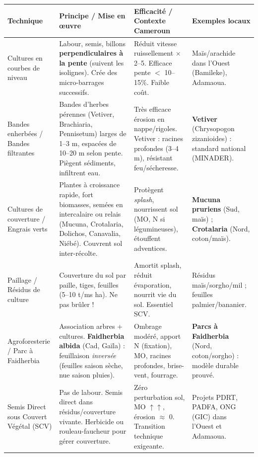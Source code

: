\documentclass[11pt]{article}
\newcommand{\cle}[1]{{\popxbold\color{popdark}#1}}
\begin{document}
\begin{center}
\begin{tabularx}{\linewidth}{|l|X|X|l|}
\hline
\rowcolor{popblueL}
\textbf{Technique} & \textbf{Principe / Mise en œuvre} & \textbf{Efficacité / Contexte Cameroun} & \textbf{Exemples locaux} \\ \hline
\cle{Cultures en courbes de niveau} & Labour, semis, billons \textbf{perpendiculaires à la pente} (suivent les isolignes). Crée des micro-barrages successifs. & Réduit vitesse ruissellement $\times$ 2--5. Efficace pente $<$ 10--15\%. Faible coût. & Maïs/arachide dans l'Ouest (Bamileke), Adamaoua. \\ \hline
\cle{Bandes enherbées / Bandes filtrantes} & Bandes d'herbes pérennes (Vetiver, Brachiaria, Pennisetum) larges de 1--3 m, espacées de 10--20 m selon pente. Piègent sédiments, infiltrent eau. & Très efficace érosion en nappe/rigoles. Vetiver : racines profondes (3--4 m), résistant feu/sécheresse. & \textbf{Vetiver} (Chrysopogon zizanioides) : standard national (MINADER). \\ \hline
\cle{Cultures de couverture / Engrais verts} & Plantes à croissance rapide, fort biomasses, semées en intercalaire ou relais (Mucuna, Crotalaria, Dolichos, Canavalia, Niébé). Couvrent sol inter-récolte. & Protègent \emph{splash}, nourrissent sol (MO, N si légumineuses), étouffent adventices. & \textbf{Mucuna pruriens} (Sud, maïs) ; \textbf{Crotalaria} (Nord, coton/maïs). \\ \hline
\cle{Paillage / Résidus de culture} & Couverture du sol par paille, tiges, feuilles (5--10 t/ms ha). Ne pas brûler ! & Amortit splash, réduit évaporation, nourrit vie du sol. Essentiel SCV. & Résidus maïs/sorgho/mil ; feuilles palmier/bananier. \\ \hline
\cle{Agroforesterie / Parc à Faidherbia} & Association arbres + cultures. \textbf{Faidherbia albida} (Cad, Gaïla) : feuillaison \emph{inversée} (feuilles saison sèche, nue saison pluies). & Ombrage modéré, apport N (fixation), MO, racines profondes, brise-vent, fourrage. & \textbf{Parcs à Faidherbia} (Nord, coton/sorgho) : modèle durable prouvé. \\ \hline
\cle{Semis Direct sous Couvert Végétal (SCV)} & Pas de labour. Semis direct dans résidus/couverture vivante. Herbicide ou rouleau-faucheur pour gérer couverture. & Zéro perturbation sol, MO $\uparrow\uparrow$, érosion $\approx$ 0. Transition technique exigeante. & Projets PDRT, PADFA, ONG (GIC) dans l'Ouest et Adamaoua. \\ \hline
\end{tabularx}
\end{center}
\end{document}

